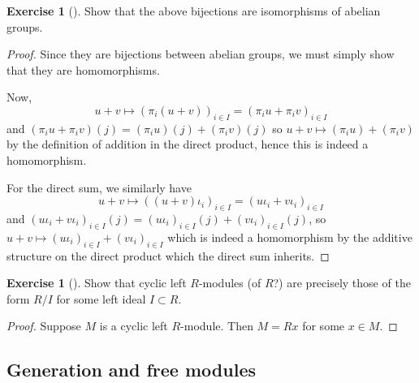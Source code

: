\documentclass[reqno]{amsart}
\theoremstyle{definition}
\newtheorem{exercise}[theorem]{Exercise}
\theoremstyle{remark}
\begin{document}
    \begin{exercise}[]
        Show that the above bijections are isomorphisms of
        abelian groups.
    \end{exercise}

    \begin{proof}
        Since they are bijections between abelian groups, we
        must simply show that they are homomorphisms.

        Now,
        \[
        u+v \mapsto \left( \pi_i \left( u+v \right)  \right)_{i \in I}
        = \left( \pi_i u + \pi_i v \right)_{i \in I}
        \] 
        and
        $\left( \pi_i u + \pi_i v \right)(j)
        = \left( \pi_iu \right) (j) + 
        \left( \pi_i v \right) (j)$
        so $u+v \mapsto \left( \pi_i u \right) +
        \left( \pi_i v \right) $ by the definition
        of addition in the direct product, hence this
        is indeed a homomorphism.

        For the direct sum, we similarly have
        \[
        u+v \mapsto \left( \left( u+v \right) \iota_i \right)_{i \in I}
        = \left( u \iota_i + v \iota_i \right)_{i \in I}
        \] 
        and
        $\left( u \iota_i + v \iota_i \right)_{i \in I}(j)
        = \left( u \iota_i \right)_{i \in I} (j)
        + \left( v \iota_i \right)_{i \in I}(j)$, so
        $u+v \mapsto \left( u \iota_i \right)_{i \in I}
        + \left( v \iota_i \right)_{i \in I}$
        which is indeed a homomorphism by
        the additive structure on the direct product which
        the direct sum inherits.
        
    \end{proof}
        
        \begin{exercise}[]
            Show that cyclic left $R$-modules (of $R$?)
            are precisely those
            of the form $R /I$ for some left ideal
            $I \subset R$.
        \end{exercise}

        \begin{proof}
            Suppose $M$ is a cyclic left $R$-module.
            Then $M = R x$ for some $x \in M$.

        \end{proof}


        \subsection{Generation and free modules}
\end{document}
